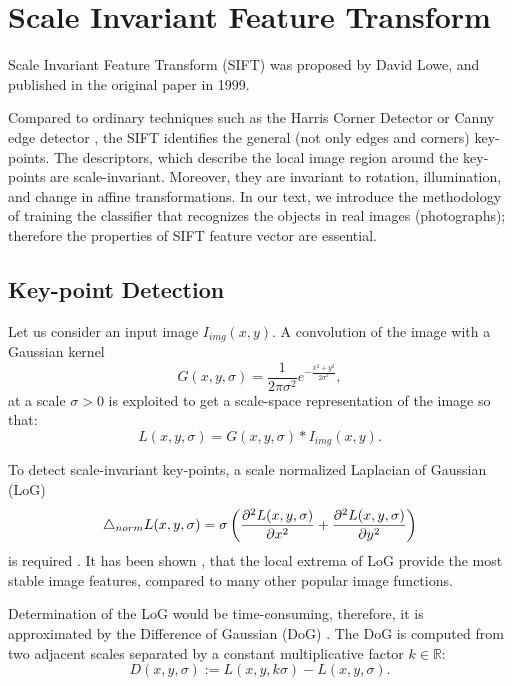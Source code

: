 \section{Scale Invariant Feature Transform}
Scale Invariant Feature Transform (SIFT) was proposed by David Lowe, and published in the original paper \cite{Lowe1999} in 1999.

Compared to ordinary techniques such as the Harris Corner Detector \cite{Harris1988} or Canny edge detector \cite{Canny1986}, the SIFT identifies the general (not only edges and corners) key-points. The descriptors, which describe the local image region around the key-points are scale-invariant. Moreover, they are invariant to rotation, illumination, and change in affine transformations. In our text, we introduce the methodology of training the classifier that recognizes the objects in real images (photographs); therefore the properties of SIFT feature vector are essential.

\subsection{Key-point Detection}

Let us consider an input image \( I_{img}(x,y) \). A convolution of the image with a Gaussian kernel
\begin{equation}
    G(x,y,\sigma) = \frac{1}{2\pi\sigma^2}e^{-\frac{x^2+y^2}{2\sigma^2}},
    \label{eq:Gaussian_kernel}
\end{equation}
at a scale \( \sigma > 0 \) is exploited to get a scale-space representation of the image so that:
\begin{equation}
    L(x, y,\sigma) =  G(x,y,\sigma)*I_{img}(x,y).
\end{equation}

To detect scale-invariant key-points, a scale normalized Laplacian of Gaussian (LoG)
\begin{equation}
    \mathop{}\!\mathbin\bigtriangleup_{norm} L(x, y, \sigma) = \sigma\left(\frac{\partial^2 L(x,y,\sigma)}{\partial x^2} + \frac{\partial^2 L(x,y,\sigma)}{\partial y^2}\right)
\end{equation}
is required \cite{Koenderink1984}. It has been shown \cite{Mikolajczyk2002}, that the local extrema of LoG provide the most stable image features, compared to many other popular image functions.

Determination of the LoG would be time-consuming, therefore, it is approximated by the Difference of Gaussian (DoG) \cite{Lowe2004}. The DoG is computed from two adjacent scales separated by a constant multiplicative factor $k \in \mathbb{R}$:
\begin{equation}
    D(x,y,\sigma) := L(x,y,k\sigma) - L(x,y,\sigma).
\end{equation}

